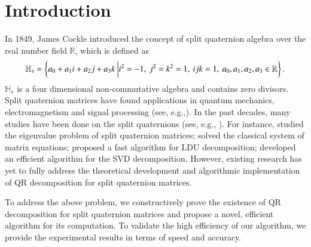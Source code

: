 \documentclass[3p]{elsarticle}
\numberwithin{equation}{section}
\begin{document}

\section{Introduction}
In 1849, James Cockle \cite{Cockle1849} introduced the concept of split quaternion algebra over the real number field $\mathbb{R}$,   which is defined as
\begin{equation*}
    \small
    \mathbb{H}_s = \left\{ a_0 + a_1 i + a_2 j + a_3 k \ \bigg| i^2 = -1,\ j^2 = k^2 = 1, \ ijk = 1, \ a_0, a_1, a_2, a_3 \in \mathbb{R}\right\}. 
\end{equation*} 
$\mathbb{H}_s$ is a four dimensional non-commutative algebra and contains zero divisors. 
Split quaternion matrices have found applications in quantum mechanics, electromagnetism and signal processing (see, e.g.,\cite{Gog2022, Hasebe2010, Le2022, Z2022, Wang2023}). In the past decades, many studies have been done on the split quaternions (see, e.g., \cite{Abłamowicz2020, Yasemin2012, TJiang2015, Jiang2018, TJiang2018, Zhuo2020, Yang2020, mma, wang, Wang2021, Gang2024, yuan, Zhang2015}). For instance, \cite{Jiang2018} studied the eigenvalue problem of split quaternion matrices; \cite{wang} solved the classical system of matrix equations; 
 \cite{Wang2021} proposed a fast algorithm for LDU decomposition; \cite{Gang2024} developed an efficient algorithm for the SVD decomposition. However, existing research has yet to fully address the theoretical development and algorithmic implementation of QR decomposition for split quaternion matrices.

To address the above problem, we constructively prove the existence of QR decomposition for split quaternion matrices and propose a novel, efficient algorithm for its computation.  To validate the high efficiency of our algorithm, we provide the experimental results in terms of speed and accuracy.
\end{document}
